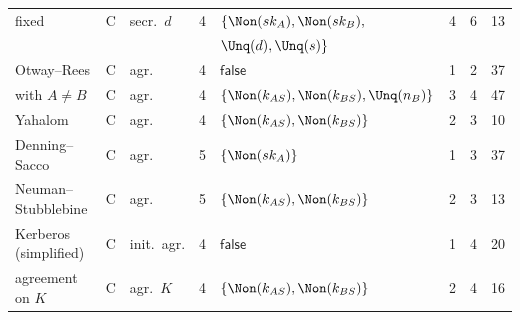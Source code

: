 \begin{table}[t]
\begin{tabular}{lcl r l r r r}
\quad fixed & C & secr.\ $d$ & 4 & $\{\Non(sk_A), \Non(sk_B),$ & 4 & 6 & 13\\
 & & & & \quad $\Unq(d), \Unq(s)\}$ & & & \\
Otway--Rees & C & agr. & 4 & $\mathsf{false}$ & 1 & 2 & 37\\
\quad with $A \neq B$ & C & agr. & 4 & $\{\Non(k_{AS}), \Non(k_{BS}), \Unq(n_B)\}$ & 3 & 4 & 47\\
Yahalom & C & agr. & 4 & $\{\Non(k_{AS}), \Non(k_{BS})\}$ & 2 & 3 & 10\\
Denning--Sacco & C & agr. & 5 & $\{\Non(sk_A)\}$ & 1 & 3 & 37\\
Neuman--Stubblebine & C & agr. & 5 & $\{\Non(k_{AS}), \Non(k_{BS})\}$ & 2 & 3 & 13\\
Kerberos (simplified) & C & init.\ agr. & 4 & $\mathsf{false}$ & 1 & 4 & 20\\
\quad agreement on $K$ & C & agr.\ $K$ & 4 & $\{\Non(k_{AS}), \Non(k_{BS})\}$ & 2 & 4 & 16\\
\bottomrule
\end{tabular}
\end{table}
